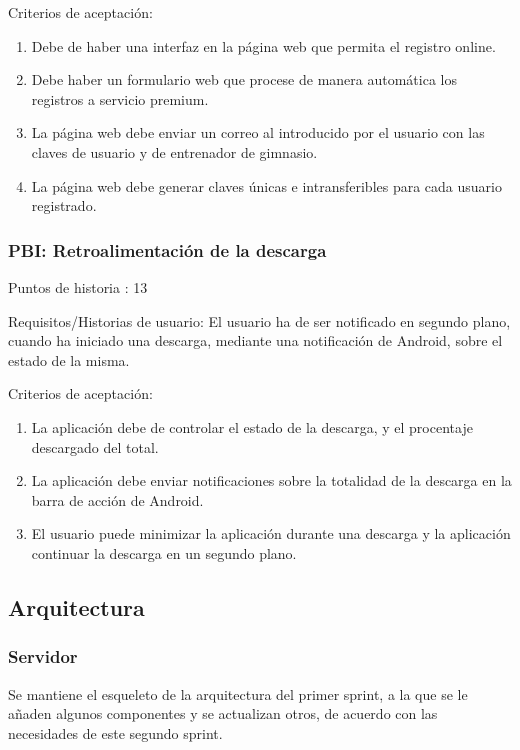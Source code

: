 \documentclass[11pt,a4paper]{report}
\begin{document}
Criterios de aceptación:
\begin{enumerate}
	\item Debe de haber una interfaz en la página web que permita el registro online.

	\item Debe haber un formulario web que procese de manera automática los registros a servicio premium.

	\item La página web debe enviar un correo al introducido por el usuario con las claves de usuario y de entrenador de gimnasio.

	\item La página web debe generar claves únicas e intransferibles para cada usuario registrado.

\end{enumerate}
\subsubsection{PBI: Retroalimentación de la descarga} 

Puntos de historia : 13

Requisitos/Historias de usuario: El usuario ha de ser notificado en segundo plano, cuando ha iniciado una descarga, mediante una notificación de Android, sobre el estado de la misma.

Criterios de aceptación:
\begin{enumerate}
	\item La aplicación debe de controlar el estado de la descarga, y el procentaje descargado del total.

	\item La aplicación debe enviar notificaciones sobre la totalidad de la descarga en la barra de acción de Android.

	\item El usuario puede minimizar la aplicación durante una descarga y la aplicación continuar la descarga en un segundo plano.
\end{enumerate}

\subsection{Arquitectura}
\subsubsection{Servidor}
Se mantiene el esqueleto de la arquitectura del primer sprint, a la que se le añaden algunos componentes y se actualizan otros, de acuerdo con las necesidades de este segundo sprint.
\end{document}
